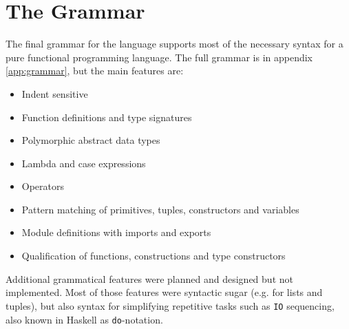 \section{The Grammar}


The final grammar for the language supports most of the necessary syntax for a pure functional programming language.  The full grammar is in appendix \ref{app:grammar}, but the main features are:

\begin{itemize}
  \item Indent sensitive
  \item Function definitions and type signatures
  \item Polymorphic abstract data types
  \item Lambda and case expressions
  \item Operators
  \item Pattern matching of primitives, tuples, constructors and variables
  \item Module definitions with imports and exports
  \item Qualification of functions, constructions and type constructors
\end{itemize}

Additional grammatical features %
were planned and designed but not implemented. Most of those features were syntactic sugar (e.g. for lists and tuples), but also syntax for simplifying repetitive tasks such as \texttt{IO} sequencing, also known in Haskell as \texttt{do}-notation. 